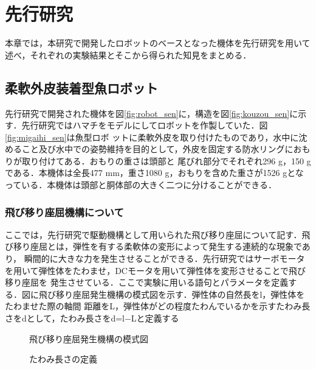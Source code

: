 \newpage
\section{先行研究}
本章では，本研究で開発したロボットのベースとなった機体を先行研究を用いて述べ，それぞれの実験結果とそこから得られた知見をまとめる．

\subsection{柔軟外皮装着型魚ロボット}
先行研究で開発された機体を図\ref{fig:robot_sen}に，構造を図\ref{fig:kouzou_sen}に示す．先行研究ではハマチをモデルにしてロボットを作製していた．図\ref{fig:migaihi_sen}は魚型ロボ
ットに柔軟外皮を取り付けたものであり，水中に沈めること及び水中での姿勢維持を目的として，外皮を固定する防水リングにおもりが取り付けてある．おもりの重さは頭部と
尾びれ部分でそれぞれ296 g，150 gである．本機体は全長477 mm，重さ1080 g，おもりを含めた重さが1526 gとなっている．本機体は頭部と胴体部の大きく二つに分けることができる．

\subsubsection{飛び移り座屈機構について}
ここでは，先行研究で駆動機構として用いられた飛び移り座屈について記す．飛び移り座屈とは，弾性を有する柔軟体の変形によって発生する連続的な現象であり，
瞬間的に大きな力を発生させることができる．先行研究ではサーボモータを用いて弾性体をたわませ，DCモータを用いて弾性体を変形させることで飛び移り座屈を
発生させている．ここで実験に用いる語句とパラメータを定義する．図に飛び移り座屈発生機構の模式図を示す．弾性体の自然長をl，弾性体をたわませた際の軸間
距離をL，弾性体がどの程度たわんでいるかを示すたわみ長さをdとして，たわみ長さをd=l−Lと定義する

\begin{figure}[b]
    \centering
     \begin{minipage}[b]{0.45\linewidth}
        \centering
        \caption{飛び移り座屈発生機構の模式図\cite{kyu}}
        \label{fig:zakutu1_sen}
     \end{minipage}
     \hspace{0.05\linewidth}
     \begin{minipage}[b]{0.45\linewidth}
        \centering
        \caption{たわみ長さの定義\cite{kyu}}
        \label{fig:zakutu2_sen}
     \end{minipage}
\end{figure}

